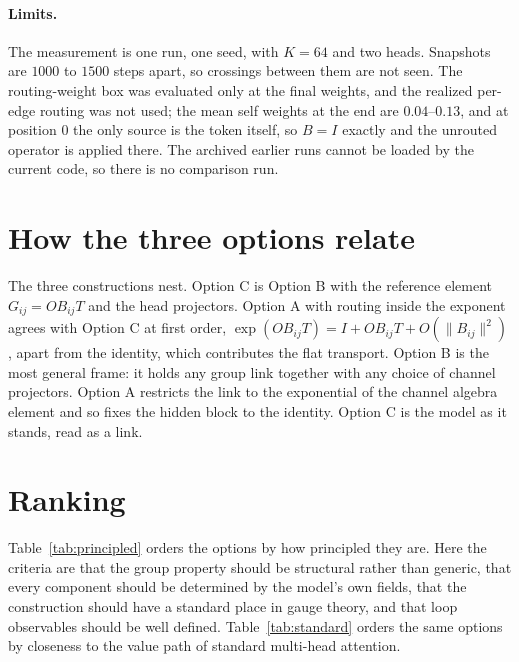 \documentclass[11pt]{article}
\theoremstyle{definition}
\theoremstyle{remark}
\begin{document}
\paragraph{Limits.}
The measurement is one run, one seed, with $K=64$ and two heads. Snapshots are $1000$ to $1500$ steps apart, so crossings between them are not seen. The routing-weight box was evaluated only at the final weights, and the realized per-edge routing was not used; the mean self weights at the end are $0.04$--$0.13$, and at position $0$ the only source is the token itself, so $B=I$ exactly and the unrouted operator is applied there. The archived earlier runs cannot be loaded by the current code, so there is no comparison run.

\section{How the three options relate}
\label{sec:relations}

The three constructions nest. Option C is Option B with the reference element $G_{ij}=OB_{ij}T$ and the head projectors. Option A with routing inside the exponent agrees with Option C at first order, $\exp(OB_{ij}T)=I+OB_{ij}T+O(\|B_{ij}\|^2)$, apart from the identity, which contributes the flat transport. Option B is the most general frame: it holds any group link together with any choice of channel projectors. Option A restricts the link to the exponential of the channel algebra element and so fixes the hidden block to the identity. Option C is the model as it stands, read as a link.

\section{Ranking}
\label{sec:ranking}

Table~\ref{tab:principled} orders the options by how principled they are. Here the criteria are that the group property should be structural rather than generic, that every component should be determined by the model's own fields, that the construction should have a standard place in gauge theory, and that loop observables should be well defined. Table~\ref{tab:standard} orders the same options by closeness to the value path of standard multi-head attention.
\end{document}
